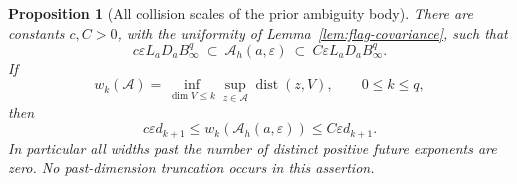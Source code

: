 \documentclass[11pt]{amsart}
\newtheorem{proposition}[theorem]{Proposition}
\theoremstyle{definition}\newtheorem{definition}[theorem]{Definition}
\theoremstyle{remark}\newtheorem{remark}[theorem]{Remark}
\begin{document}
\begin{proposition}[All collision scales of the prior ambiguity body]
\label{prop:ambiguity-ellipsoid}
There are constants $c,C>0$, with the uniformity of
Lemma~\ref{lem:flag-covariance}, such that
\begin{equation}\label{eq:ambiguity-sandwich}
 c\varepsilon L_aD_aB_\infty^q
 \ \subset\ \mathcal A_h(a,\varepsilon)
 \ \subset\ C\varepsilon L_aD_aB_\infty^q.
\end{equation}
If
\[
 w_k(\mathcal A)=\inf_{\dim V\le k}\sup_{z\in\mathcal A}
                        \operatorname{dist}(z,V),\qquad 0\le k\le q,
\]
then
\begin{equation}\label{eq:ambiguity-widths}
 c\varepsilon d_{k+1}\le w_k(\mathcal A_h(a,\varepsilon))
                         \le C\varepsilon d_{k+1}.
\end{equation}
In particular all widths past the number of distinct positive future
exponents are zero. No past-dimension truncation occurs in this assertion.
\end{proposition}
\end{document}
